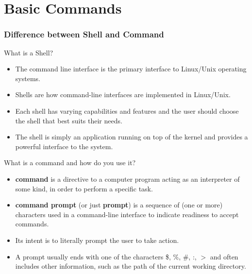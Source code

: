 \documentclass[10pt,t]{beamer}
\begin{document}
\section{Basic Commands}
\begin{frame}[fragile]
  \frametitle{Difference between Shell and Command}
  \begin{block}{What is a Shell?}
    \begin{itemize}
    \item The command line interface is the primary interface to Linux/Unix operating systems.
    \item Shells are how command-line interfaces are implemented in Linux/Unix.
    \item Each shell has varying capabilities and features and the user should choose the shell that best suits their needs.
    \item The shell is simply an application running on top of the kernel and provides a powerful interface to the system.
    \end{itemize}
  \end{block}
  \begin{exampleblock}{What is a command and how do you use it?}
    \begin{itemize}
    \item \textbf{command} is a directive to a computer program acting as an interpreter of some kind, in order to perform a specific task.
    \item \textbf{command prompt} (or just \textbf{prompt}) is a sequence of (one or more) characters used in a command-line interface to indicate readiness to accept commands.
    \item Its intent is to literally prompt the user to take action. 
    \item A prompt usually ends with one of the characters \$, \%, \#, :, $>$ and often includes other information, such as the path of the current working directory.
    \end{itemize}
  \end{exampleblock}
\end{frame}
  
\end{document}
